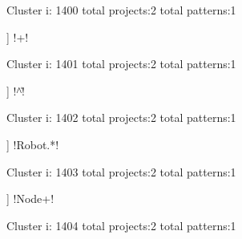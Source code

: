 Cluster i: 1400
total projects:2
total patterns:1
\begin{multicols}{1}
\begin{description}[noitemsep,topsep=0pt]
\item [[2] ] \cverb!\n[ ]+\n!
\end{description}
\end{multicols}







Cluster i: 1401
total projects:2
total patterns:1
\begin{multicols}{1}
\begin{description}[noitemsep,topsep=0pt]
\item [[2] ] \cverb!^\|\s*!
\end{description}
\end{multicols}







Cluster i: 1402
total projects:2
total patterns:1
\begin{multicols}{1}
\begin{description}[noitemsep,topsep=0pt]
\item [[2] ] \cverb!Robot.*!
\end{description}
\end{multicols}







Cluster i: 1403
total projects:2
total patterns:1
\begin{multicols}{1}
\begin{description}[noitemsep,topsep=0pt]
\item [[2] ] \cverb!Node\s+!
\end{description}
\end{multicols}







Cluster i: 1404
total projects:2
total patterns:1
\begin{multicols}{1}
\begin{description}[noitemsep,topsep=0pt]
\item [[2] ] \cverb!---\s*$!
\end{description}
\end{multicols}







